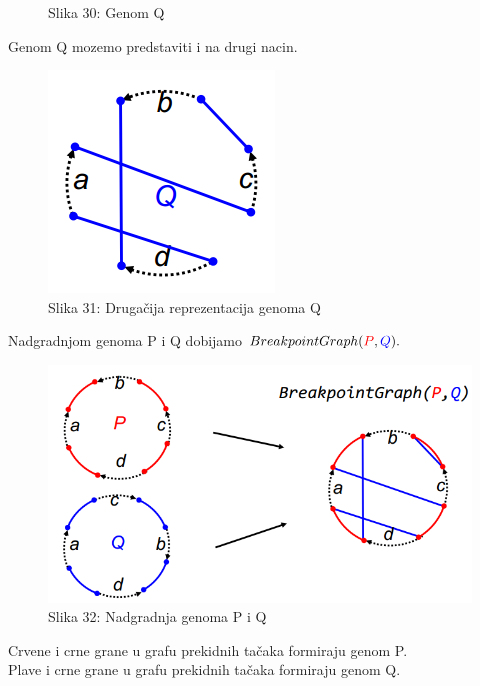 \documentclass{article}
\begin{document}
\begin{figure}[h!]
  \caption{Slika 30: Genom Q}
\endminipage\hfill
\end{figure}

Genom {\color{blue}Q} mozemo predstaviti i na drugi nacin.
\begin{figure}[h!]
\centering
\includegraphics[scale=0.75]{slike/Q2.PNG}
\caption{Slika 31: Drugačija reprezentacija genoma Q}
\label{slika:X}
\end{figure}

\newpage
\noindent Nadgradnjom genoma {\color{red}P} i {\color{blue}Q} dobijamo $BreakpointGraph({\color{red}P}, {\color{blue}Q}).$
\begin{figure}[h]
\includegraphics[scale=0.7, left]{slike/breakpointgraph.PNG}
\caption{Slika 32: Nadgradnja genoma P i Q}
\label{slika:X}
\end{figure}

{\color{red} Crvene} i crne grane u grafu prekidnih tačaka formiraju genom P.\\

{\color{blue} Plave} i crne grane u grafu prekidnih tačaka  formiraju genom Q.\\
\end{document}
